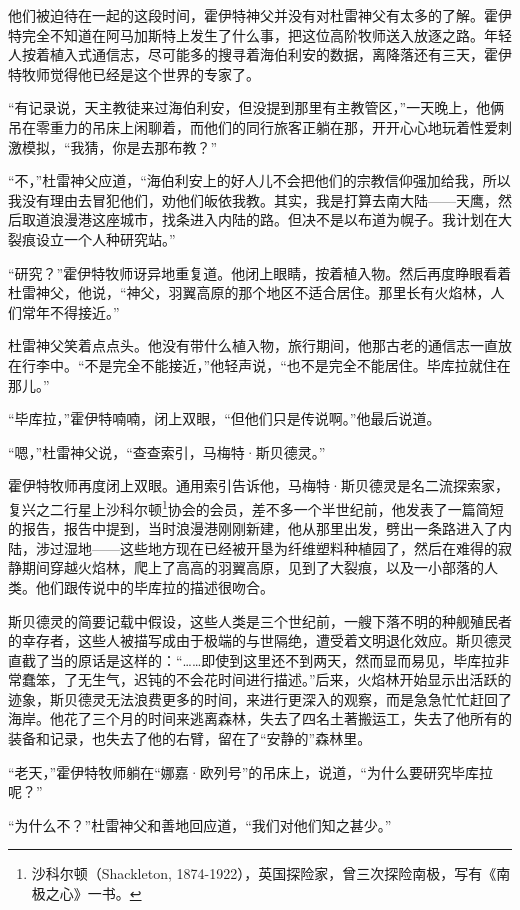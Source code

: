 \documentclass[AutoFakeBold=true]{book}
\begin{document}
他们被迫待在一起的这段时间，霍伊特神父并没有对杜雷神父有太多的了解。霍伊特完全不知道在阿马加斯特上发生了什么事，把这位高阶牧师送入放逐之路。年轻人按着植入式通信志，尽可能多的搜寻着海伯利安的数据，离降落还有三天，霍伊特牧师觉得他已经是这个世界的专家了。

``有记录说，天主教徒来过海伯利安，但没提到那里有主教管区，''一天晚上，他俩吊在零重力的吊床上闲聊着，而他们的同行旅客正躺在那，开开心心地玩着性爱刺激模拟，``我猜，你是去那布教？''

``不，''杜雷神父应道，``海伯利安上的好人儿不会把他们的宗教信仰强加给我，所以我没有理由去冒犯他们，劝他们皈依我教。其实，我是打算去南大陆——天鹰，然后取道浪漫港这座城市，找条进入内陆的路。但决不是以布道为幌子。我计划在大裂痕设立一个人种研究站。''

``研究？''霍伊特牧师讶异地重复道。他闭上眼睛，按着植入物。然后再度睁眼看着杜雷神父，他说，``神父，羽翼高原的那个地区不适合居住。那里长有火焰林，人们常年不得接近。''

杜雷神父笑着点点头。他没有带什么植入物，旅行期间，他那古老的通信志一直放在行李中。``不是完全不能接近，''他轻声说，``也不是完全不能居住。毕库拉就住在那儿。''

``毕库拉，''霍伊特喃喃，闭上双眼，``但他们只是传说啊。''他最后说道。

``嗯，''杜雷神父说，``查查索引，马梅特·斯贝德灵。''

霍伊特牧师再度闭上双眼。通用索引告诉他，马梅特·斯贝德灵是名二流探索家，复兴之二行星上沙科尔顿\footnote{沙科尔顿（Shackleton, 1874-1922），英国探险家，曾三次探险南极，写有《南极之心》一书。}协会的会员，差不多一个半世纪前，他发表了一篇简短的报告，报告中提到，当时浪漫港刚刚新建，他从那里出发，劈出一条路进入了内陆，涉过湿地——这些地方现在已经被开垦为纤维塑料种植园了，然后在难得的寂静期间穿越火焰林，爬上了高高的羽翼高原，见到了大裂痕，以及一小部落的人类。他们跟传说中的毕库拉的描述很吻合。

斯贝德灵的简要记载中假设，这些人类是三个世纪前，一艘下落不明的种舰殖民者的幸存者，这些人被描写成由于极端的与世隔绝，遭受着文明退化效应。斯贝德灵直截了当的原话是这样的：``……即使到这里还不到两天，然而显而易见，毕库拉非常蠢笨，了无生气，迟钝的不会花时间进行描述。''后来，火焰林开始显示出活跃的迹象，斯贝德灵无法浪费更多的时间，来进行更深入的观察，而是急急忙忙赶回了海岸。他花了三个月的时间来逃离森林，失去了四名土著搬运工，失去了他所有的装备和记录，也失去了他的右臂，留在了``安静的''森林里。

``老天，''霍伊特牧师躺在``娜嘉·欧列号''的吊床上，说道，``为什么要研究毕库拉呢？''

``为什么不？''杜雷神父和善地回应道，``我们对他们知之甚少。''
\end{document}
